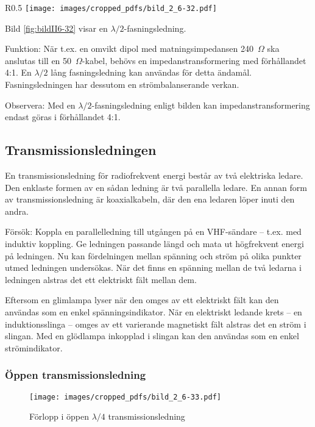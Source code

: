 \begin{wrapfigure}[13]{R}{0.5\textwidth}
  \texttt{[image: images/cropped\_pdfs/bild\_2\_6-32.pdf]}
  \caption{$\lambda/2$-fasningsledning}
  \label{fig:bildII6-32}
\end{wrapfigure}

Bild \ref{fig:bildII6-32} visar en $\lambda/2$-fasningsledning.

Funktion: När t.ex. en omvikt dipol med matningsimpedansen 240~\(\Omega\) ska
anslutas till en 50~\(\Omega\)-kabel, behövs en impedanstransformering med
förhållandet 4:1.
En \(\lambda/2\) lång fasningsledning kan användas för detta ändamål.
Fasningsledningen har dessutom en strömbalanserande verkan.

Observera: Med en \(\lambda/2\)-fasningsledning enligt bilden kan
impedanstransformering endast göras i förhållandet 4:1.

\subsection{Transmissionsledningen}

En transmissionsledning för radiofrekvent energi består av två elektriska
ledare.
Den enklaste formen av en sådan ledning är två parallella ledare.
En annan form av transmissionsledning är koaxialkabeln, där den ena ledaren
löper inuti den andra.

Försök: Koppla en parallelledning till utgången på en VHF-sändare --
t.ex. med induktiv koppling.
Ge ledningen passande längd och mata ut högfrekvent energi på ledningen.
Nu kan fördelningen mellan spänning och ström på olika punkter utmed ledningen
undersökas.
När det finns en spänning mellan de två ledarna i ledningen alstras det ett
elektriskt fält mellan dem.

Eftersom en glimlampa lyser när den omges av ett elektriskt fält kan
den användas som en enkel spänningsindikator.
När en elektriskt ledande krets -- en induktionsslinga -- omges av ett
varierande magnetiskt fält alstras det en ström i slingan.
Med en glödlampa inkopplad i slingan kan den användas som en enkel
strömindikator.

\subsubsection{Öppen transmissionsledning}

\begin{figure}
  \texttt{[image: images/cropped\_pdfs/bild\_2\_6-33.pdf]}
  \caption{Förlopp i öppen $\lambda/4$ transmissionsledning}
  \label{fig:bildII6-33}
\end{figure}

